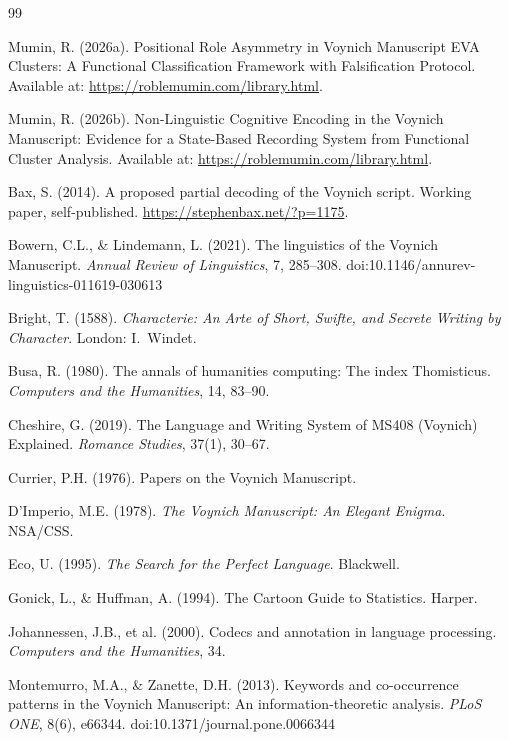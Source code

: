 \documentclass[11pt,a4paper,twocolumn]{article}
\begin{document}
\begin{thebibliography}{99}
\small

 Mumin, R. (2026a). Positional Role Asymmetry in Voynich Manuscript EVA Clusters: A Functional Classification Framework with Falsification Protocol. Available at: \url{https://roblemumin.com/library.html}.

 Mumin, R. (2026b). Non-Linguistic Cognitive Encoding in the Voynich Manuscript: Evidence for a State-Based Recording System from Functional Cluster Analysis. Available at: \url{https://roblemumin.com/library.html}.

 Bax, S. (2014). A proposed partial decoding of the Voynich script. Working paper, self-published. \url{https://stephenbax.net/?p=1175}.

 Bowern, C.L., \& Lindemann, L. (2021). The linguistics of the Voynich Manuscript. \textit{Annual Review of Linguistics}, 7, 285--308. doi:10.1146/annurev-linguistics-011619-030613

 Bright, T. (1588). \textit{Characterie: An Arte of Short, Swifte, and Secrete Writing by Character}. London: I.\ Windet.

 Busa, R. (1980). The annals of humanities computing: The index Thomisticus. \textit{Computers and the Humanities}, 14, 83--90.

 Cheshire, G. (2019). The Language and Writing System of MS408 (Voynich) Explained. \textit{Romance Studies}, 37(1), 30--67.

 Currier, P.H. (1976). Papers on the Voynich Manuscript.

 D'Imperio, M.E. (1978). \textit{The Voynich Manuscript: An Elegant Enigma}. NSA/CSS.

 Eco, U. (1995). \textit{The Search for the Perfect Language}. Blackwell.

 Gonick, L., \& Huffman, A. (1994). The Cartoon Guide to Statistics. Harper.

 Johannessen, J.B., et al. (2000). Codecs and annotation in language processing. \textit{Computers and the Humanities}, 34.

 Montemurro, M.A., \& Zanette, D.H. (2013). Keywords and co-occurrence patterns in the Voynich Manuscript: An information-theoretic analysis. \textit{PLoS ONE}, 8(6), e66344. doi:10.1371/journal.pone.0066344


\end{thebibliography}
\end{document}
